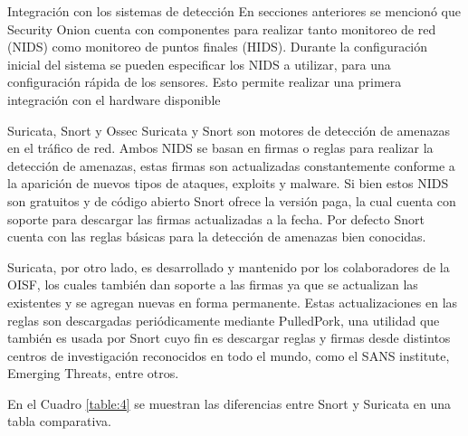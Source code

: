    \begin{section}{Integración con los sistemas de detección}
        En secciones anteriores se mencionó que Security Onion cuenta con componentes para realizar tanto monitoreo de red (NIDS) como monitoreo de puntos finales (HIDS). Durante la configuración inicial del sistema se pueden especificar los NIDS a utilizar, para una configuración rápida de los sensores. Esto permite realizar una primera integración con el hardware disponible
   \end{section}
   \pagebreak
   \begin{subsection}{Suricata, Snort y Ossec}
        Suricata y Snort son motores de detección de amenazas en el tráfico de red. Ambos NIDS se basan en firmas o reglas para realizar la detección de amenazas, estas firmas son actualizadas constantemente conforme a la aparición de nuevos tipos de ataques, exploits y malware. Si bien estos NIDS son gratuitos y de código abierto Snort ofrece la versión paga, la cual cuenta con soporte para descargar las firmas actualizadas a la fecha. Por defecto Snort cuenta con las reglas básicas para la detección de amenazas bien conocidas. \par
    	Suricata, por otro lado, es desarrollado y mantenido por los colaboradores de la OISF, los cuales también dan soporte a las firmas ya que se actualizan las existentes y se agregan nuevas en forma permanente. Estas actualizaciones en las reglas son descargadas periódicamente mediante PulledPork, una utilidad que también es usada por Snort cuyo fin es descargar reglas y firmas desde distintos centros de investigación reconocidos en todo el mundo, como el SANS institute, Emerging Threats, entre otros. \par
        En el Cuadro \ref{table:4} se muestran las diferencias entre Snort y Suricata en una tabla comparativa. 
        
        \begin{table}[H]
        \centering
        \begin{tabular}{|m{10em}|m{11em}|m{11em}|}
        

\end{tabular}
\end{table}
\end{subsection}

